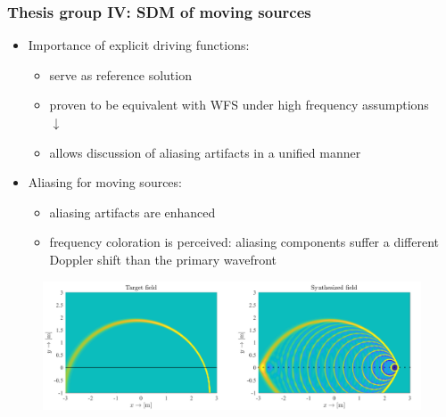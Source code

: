 \documentclass{beamer}
\begin{document}
\begin{frame}
\frametitle{Thesis group IV: SDM of moving sources}
\begin{itemize}
\item Importance of explicit driving functions:
	\begin{itemize}
	\item serve as reference solution
	\item proven to be equivalent with WFS under high frequency assumptions
	\\ \hspace{30mm} $\downarrow$ \hspace{10mm} \\
	\item {\color{blue} allows discussion of aliasing artifacts in a unified manner}
	\end{itemize}
\item Aliasing for moving sources:
	\begin{itemize}
	\item aliasing artifacts are enhanced
	\item frequency coloration is perceived: aliasing components suffer a different Doppler shift than the primary wavefront
	\end{itemize}
\end{itemize}
\begin{center}\begin{figure} \includegraphics[scale=0.4]{figs/aliasing_artifact.png} \end{figure}\end{center}

\end{frame}
\end{document}
